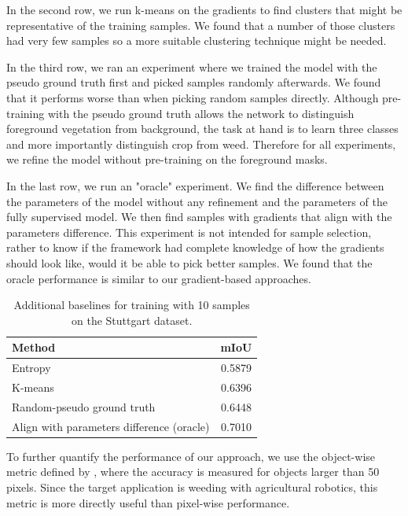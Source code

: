 \documentclass[letterpaper, 10 pt, conference]{ieeeconf}  %
\begin{document}
In the second row, we run k-means on the gradients to find clusters that might be representative of the training samples. We found that a number of those clusters had very few samples so a more suitable clustering technique might be needed. 

In the third row, we ran an experiment where we trained the model with the pseudo ground truth first and picked samples randomly afterwards. We found that it performs worse than when picking random samples directly. Although pre-training with the pseudo ground truth allows the network to distinguish foreground vegetation from background, the task at hand is to learn three classes and more importantly distinguish crop from weed. Therefore for all experiments, we refine the model without pre-training on the foreground masks.

In the last row, we run an "oracle" experiment. We find the difference between the parameters of the model without any refinement and the parameters of the fully supervised model. We then find samples with gradients that align with the parameters difference. This experiment is not intended for sample selection, rather to know if the framework had complete knowledge of how the gradients should look like, would it be able to pick better samples. We found that the oracle performance is similar to our gradient-based approaches.



    
        \begin{table}
           \vspace{1em}
        \centering
        \caption{Additional baselines for training with 10 samples on the Stuttgart dataset.}
        \begin{tabular}{@{}lc@{}} 
            \toprule
            Method  & mIoU \\ 
            \midrule 
             Entropy   \cite{chakraborty2015active, zhou2017fine} & 0.5879   \\ \addlinespace
    		  K-means  & 0.6396  \\ \addlinespace
    		  Random-pseudo ground truth   & 0.6448  \\ \addlinespace
    		  Align with parameters difference (oracle)  & 0.7010  \\  
            \bottomrule
        \end{tabular}
        \label{tab:add_baselines}
    \end{table}
    
    
    
To further quantify the performance of our approach, we use the object-wise metric defined by \cite{milioto2018real}, where the accuracy is measured for objects larger than 50 pixels. Since the target application is weeding with agricultural robotics, this metric is more directly useful than pixel-wise performance.  
\end{document}

